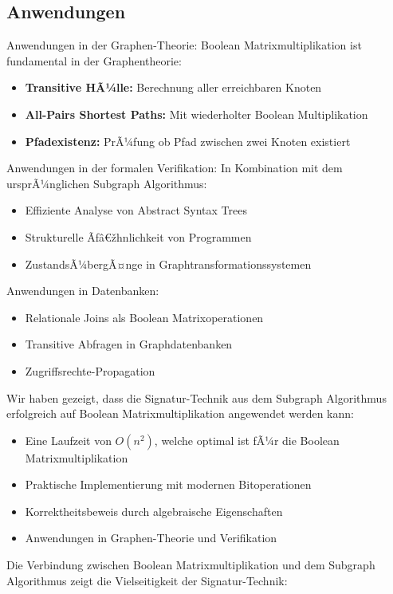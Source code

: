 ﻿\documentclass[a4paper,12pt]{article}
\theoremstyle{definition}
\begin{document}
\subsection{Anwendungen}
Anwendungen in der Graphen-Theorie: Boolean Matrixmultiplikation ist fundamental in der Graphentheorie:
\begin{itemize}
	\item[-] \textbf{Transitive HÃ¼lle:} Berechnung aller erreichbaren Knoten
	\item[-] \textbf{All-Pairs Shortest Paths:} Mit wiederholter Boolean Multiplikation
	\item[-] \textbf{Pfadexistenz:} PrÃ¼fung ob Pfad zwischen zwei Knoten existiert
\end{itemize}
Anwendungen in der formalen Verifikation: In Kombination mit dem ursprÃ¼nglichen Subgraph Algorithmus:
\begin{itemize}
	\item[-] Effiziente Analyse von Abstract Syntax Trees
	\item[-] Strukturelle Ãƒâ€žhnlichkeit von Programmen
	\item[-] ZustandsÃ¼bergÃ¤nge in Graphtransformationssystemen
\end{itemize}
Anwendungen in Datenbanken:
\begin{itemize}
	\item[-] Relationale Joins als Boolean Matrixoperationen
	\item[-] Transitive Abfragen in Graphdatenbanken
	\item[-] Zugriffsrechte-Propagation
\end{itemize}

Wir haben gezeigt, dass die Signatur-Technik aus dem Subgraph Algorithmus erfolgreich auf Boolean Matrixmultiplikation angewendet werden kann:
\begin{itemize}
	\item[-] Eine Laufzeit von $O(n^2)$, welche optimal ist fÃ¼r die Boolean Matrixmultiplikation
	\item[-] Praktische Implementierung mit modernen Bitoperationen
	\item[-] Korrektheitsbeweis durch algebraische Eigenschaften
	\item[-] Anwendungen in Graphen-Theorie und Verifikation
\end{itemize}

Die Verbindung zwischen Boolean Matrixmultiplikation und dem Subgraph Algorithmus zeigt die Vielseitigkeit der Signatur-Technik:
\end{document}
